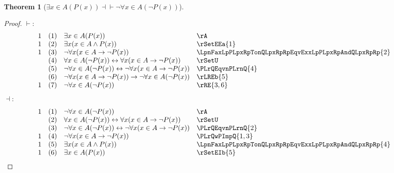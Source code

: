 \documentclass{book}
\theoremstyle{plain}
\newtheorem{theorem}{Theorem}
\theoremstyle{remark}
\theoremstyle{definition}
\begin{document}
\label{ExxInALpPLpxRpRpEqvnFaxInALpnPLpxRpRp}
\begin{theorem}[\(\exists x \in A(P(x)) \dashv\vdash \neg\forall x \in A(\neg P(x))\)]
\end{theorem}
\begin{proof}
	\(\vdash:\)
	\[
	\begin{array}{llll}
		1 & (1) & \exists x \in A(P(x)) & \rA \\
		1 & (2) & \exists x (x \in A \wedge P(x)) & \rSetEEa{1} \\
		1 & (3) & \neg\forall x(x \in A \rightarrow \neg P(x)) & \LpnFaxLpPLpxRpTonQLpxRpRpEqvExxLpPLpxRpAndQLpxRpRp{2} \\
		& (4) & \forall x \in A(\neg P(x)) \leftrightarrow \forall x(x \in A \rightarrow \neg P(x)) & \rSetU \\
		& (5) & \neg \forall x \in A(\neg P(x)) \leftrightarrow \neg\forall x(x \in A \rightarrow \neg P(x)) & \PLrQEqvnPLrnQ{4} \\
		& (6) & \neg \forall x(x \in A \rightarrow \neg P(x))\rightarrow \neg \forall x \in A(\neg P(x)) & \rLREb{5} \\
		1 & (7) & \neg \forall x \in A(\neg P(x)) & \rRE{3,6} \\
	\end{array}
	\]
	\(\dashv:\)
	\[
	\begin{array}{llll}
		1 & (1) & \neg \forall x \in A(\neg P(x)) & \rA \\
		& (2) & \forall x \in A(\neg P(x)) \leftrightarrow \forall x(x \in A \rightarrow \neg P(x)) & \rSetU \\
		& (3) & \neg \forall x \in A(\neg P(x)) \leftrightarrow \neg\forall x(x \in A \rightarrow \neg P(x)) & \PLrQEqvnPLrnQ{2} \\
		1 & (4) & \neg\forall x(x \in A \rightarrow \neg P(x)) & \PLrQwPImpQ{1,3} \\
		1 & (5) & \exists x(x \in A \wedge P(x)) & \LpnFaxLpPLpxRpTonQLpxRpRpEqvExxLpPLpxRpAndQLpxRpRp{4} \\
		1 & (6) & \exists x \in A(P(x)) & \rSetEIb{5} \\
	\end{array}
	\]
\end{proof}
\end{document}
